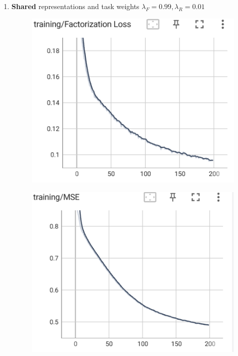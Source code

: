 \documentclass[12pt]{article}
\begin{document}
\begin{enumerate}
    \item \textbf{Shared} representations and task weights $\lambda_F=0.99, \lambda_R=0.01$

    \begin{figure}[htbp]
	\centering
	\begin{minipage}{0.4\linewidth}
		\centering
		\includegraphics[width=0.9\linewidth]{./figs/shared_factorization_loss_99_1.png}
		\label{pic one}%
	\end{minipage}
	\begin{minipage}{0.4\linewidth}
		\centering
		\includegraphics[width=0.9\linewidth]{./figs/shared_mse_99_1.png}
		\label{pic two}%
	\end{minipage}
	\begin{minipage}{0.4\linewidth}

\end{minipage}
\end{figure}
\end{enumerate}
\end{document}
